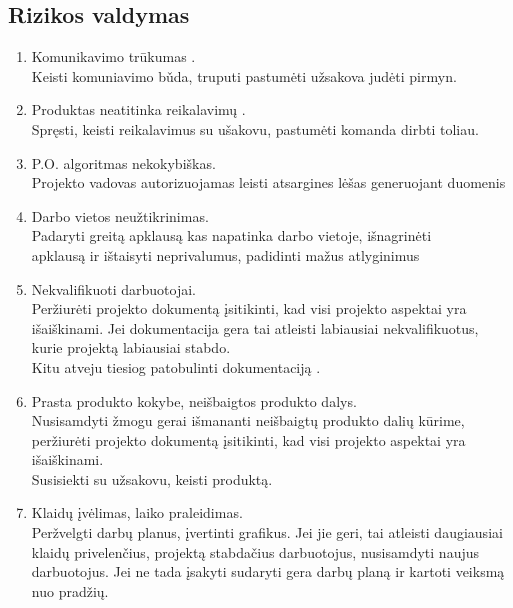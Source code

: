 \documentclass[a4paper,12pt]{article}
\begin{document}
\newpage

\subsection{Rizikos valdymas}
\begin{enumerate}
	\item Komunikavimo tr\= ukumas . \\
 			Keisti komuniavimo b\v uda, truputi pastum\. eti u\v zsakova jud\. eti pirmyn.
  			
  	\item Produktas neatitinka reikalavim\k u . \\
		Spr\k esti, keisti reikalavimus su u\v sakovu, pastum\. eti komanda dirbti toliau.
		
	\item P.O. algoritmas nekokybiškas. \\
			Projekto vadovas autorizuojamas leisti atsargines lėšas generuojant duomenis
		
	\item Darbo vietos neu\v ztikrinimas.\\
  			Padaryti greit\k a apklaus\k a kas napatinka darbo vietoje, i\v snagrin\. eti\\
  			apklaus\k a ir i\v staisyti neprivalumus, padidinti ma\v zus atlyginimus
  		
	\item Nekvalifikuoti darbuotojai. \\
			Per\v ziur\. eti projekto dokument\k a \k isitikinti, kad visi projekto aspektai
			yra i\v sai\v skinami.
			Jei dokumentacija gera tai atleisti labiausiai nekvalifikuotus, kurie projekt\k a labiausiai stabdo. \\
			Kitu atveju tiesiog patobulinti dokumentacij\k a
			.
  	
	\item Prasta produkto kokybe, nei\v sbaigtos produkto dalys.\\
			Nusisamdyti \v zmogu gerai i\v smananti nei\v sbaigt\k u produkto dali\k u 
			k\= urime, per\v ziur\. eti projekto dokument\k a \k isitikinti, 
			kad visi projekto aspektai yra i\v sai\v skinami. \\ 
			Susisiekti su u\v zsakovu, keisti produkt\k a.
		
	\item Klaid\k u \k iv\. elimas, laiko praleidimas.\\
  			Per\v zvelgti darb\k u planus, \k ivertinti grafikus.
  			Jei jie geri, tai atleisti daugiausiai klaid\k u privelen\v cius, projekt\k a
  			stabda\v cius darbuotojus, nusisamdyti naujus darbuotojus. Jei ne tada \k isakyti
  			sudaryti gera darb\k u plan\k a ir kartoti veiksm\k a nuo prad\v zi\k u.
  		

\end{enumerate}
\end{document}
